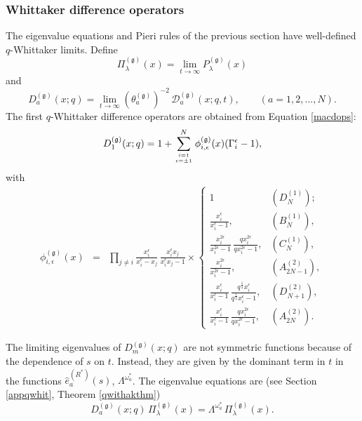 \documentclass[12pt]{amsart}
\newcommand{\g}{{\mathfrak{g}}}
\newcommand{\D}{{\mathcal{D}}}
\numberwithin{equation}{section}
\begin{document}
\subsubsection{Whittaker difference operators}\label{sec:qDiffOps}
The eigenvalue equations and Pieri rules of the previous section have well-defined $q$-Whittaker limits. Define
%
\begin{equation}\label{whitpol}
\Pi_\lambda^{(\g)}(x)=\lim_{t\to\infty} P_\lambda^{(\g)}(x)
\end{equation}
and
%
%
\begin{equation}\label{macdoD}
D_a^{(\g)}(x;q)=\lim_{t\to \infty} (\theta_a^{(\g)})^{-2} \,\D_a^{(\g)}(x;q,t),\qquad (a=1,2,...,N).
\end{equation}
%
%
The first $q$-Whittaker difference operators are obtained from Equation \eqref{macdops}:
%
%
\begin{equation}
D_1^{(\g)}(x;q)=1+\sum_{i=1\atop \epsilon=\pm1}^N \phi_{i,\epsilon}^{(\g)}(x) (\Gamma_i^{\epsilon}-1), \label{uniG}
\end{equation}
with
\begin{eqnarray}
\phi_{i,\epsilon}^{(\g)}(x)&=&\prod_{j\neq i}\frac{x_i^\epsilon}{x_i^\epsilon-x_j}\, \frac{x_i^\epsilon x_j}{x_i^\epsilon x_j-1}
\times\left\{ \begin{array}{ll}
1 & (D_N^{(1)}); \\
\frac{x_i^\epsilon}{x_i^\epsilon-1}, & (B_N^{(1)}), \\
\frac{x_i^{2\epsilon}}{x_i^{2\epsilon}-1}\, \frac{q x_i^{2\epsilon}}{q x_i^{2\epsilon}-1}, & (C_N^{(1)}),\\
\frac{x_i^{2\epsilon}}{x_i^{2\epsilon}-1}, & (A_{2N-1}^{(2)} ),\\
\frac{x_i^\epsilon}{x_i^\epsilon-1}\, \frac{q^{\frac{1}{2}} x_i^\epsilon}{q^{\frac{1}{2}} x_i^\epsilon-1}, & (D_{N+1}^{(2)}),\\
\frac{x_i^\epsilon}{x_i^\epsilon-1}\,\frac{q x_i^{2\epsilon}}{q x_i^{2\epsilon}-1}, & (A_{2N}^{(2)}).
\end{array}\right. \label{phig}
\end{eqnarray}
%
%
%
%

The limiting eigenvalues of $D_m^{(\g)}(x;q)$ are not symmetric functions because of the dependence of $s$ on $t$. Instead, they are given by the dominant term in $t$ in the functions $\hat{e}^{(R^*)}_a(s)$, $\Lambda^{\omega_a^*}$.
%
The eigenvalue equations are (see Section \ref{appqwhit}, Theorem \ref{qwithakthm})
\begin{equation}\label{eigenqwhit}
D_a^{(\g)}(x;q)\,  \Pi_\lambda^{(\g)}(x)=\Lambda^{\omega_a^*}\, \Pi_\lambda^{(\g)}(x).
\end{equation}
%
%
%
%
%
%
%
%
%
%
%
%
\end{document}
